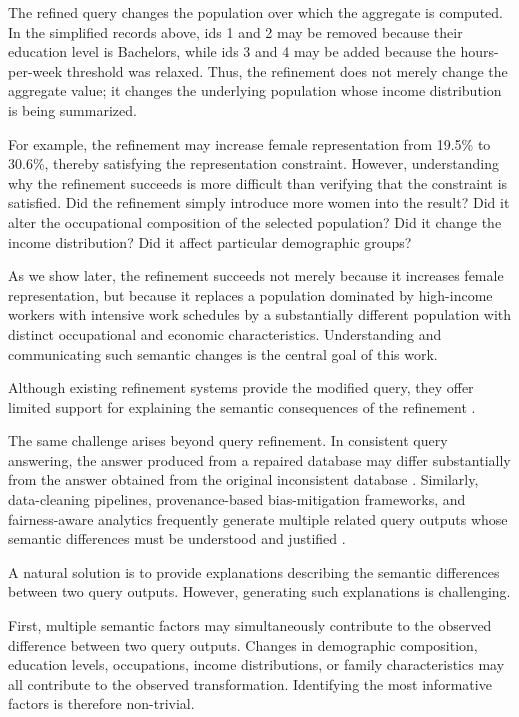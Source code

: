 \begin{example}
The refined query changes the population over which the aggregate is
computed. In the simplified records above, ids 1 and 2 may be removed
because their education level is Bachelors, while ids 3 and 4 may be
added because the hours-per-week threshold was relaxed. Thus, the
refinement does not merely change the aggregate value; it changes the
underlying population whose income distribution is being summarized.

For example, the refinement may increase female representation from
19.5\% to 30.6\%, thereby satisfying the representation constraint.
However, understanding why the refinement succeeds is more difficult
than verifying that the constraint is satisfied. Did the refinement
simply introduce more women into the result? Did it alter the
occupational composition of the selected population? Did it change the
income distribution? Did it affect particular demographic groups?
\end{example}

As we show later, the refinement succeeds not merely because it
increases female representation, but because it replaces a
population dominated by high-income workers with intensive work
schedules by a substantially different population with distinct
occupational and economic characteristics.
Understanding and communicating such semantic changes is the
central goal of this work.

Although existing refinement systems provide the modified query,
they offer limited support for explaining the semantic consequences
of the refinement \cite{ERICA,MK09}.

The same challenge arises beyond query refinement.
In consistent query answering, the answer produced from a repaired
database may differ substantially from the answer obtained from the
original inconsistent database
\cite{arenas1999,bertossi2006,bertossi2011}.
Similarly, data-cleaning pipelines, provenance-based bias-mitigation
frameworks, and fairness-aware analytics frequently generate multiple
related query outputs whose semantic differences must be understood
and justified \cite{LMSJ23,MLJ22}.

A natural solution is to provide explanations describing the
semantic differences between two query outputs.
However, generating such explanations is challenging.

First, multiple semantic factors may simultaneously contribute
to the observed difference between two query outputs.
Changes in demographic composition, education levels, occupations,
income distributions, or family characteristics may all contribute
to the observed transformation.
Identifying the most informative factors is therefore non-trivial.

